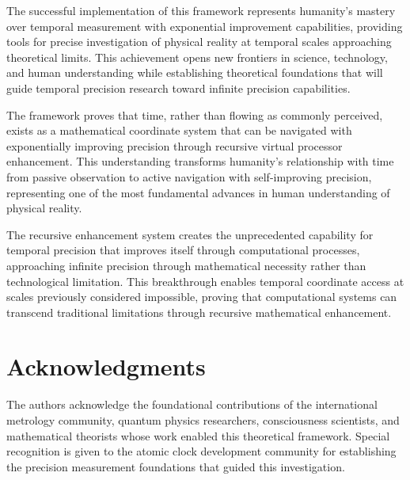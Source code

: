 \documentclass[11pt]{article}
\theoremstyle{remark}
\begin{document}
The successful implementation of this framework represents humanity's mastery over temporal measurement with exponential improvement capabilities, providing tools for precise investigation of physical reality at temporal scales approaching theoretical limits. This achievement opens new frontiers in science, technology, and human understanding while establishing theoretical foundations that will guide temporal precision research toward infinite precision capabilities.

The framework proves that time, rather than flowing as commonly perceived, exists as a mathematical coordinate system that can be navigated with exponentially improving precision through recursive virtual processor enhancement. This understanding transforms humanity's relationship with time from passive observation to active navigation with self-improving precision, representing one of the most fundamental advances in human understanding of physical reality.

The recursive enhancement system creates the unprecedented capability for temporal precision that improves itself through computational processes, approaching infinite precision through mathematical necessity rather than technological limitation. This breakthrough enables temporal coordinate access at scales previously considered impossible, proving that computational systems can transcend traditional limitations through recursive mathematical enhancement.

\section*{Acknowledgments}

The authors acknowledge the foundational contributions of the international metrology community, quantum physics researchers, consciousness scientists, and mathematical theorists whose work enabled this theoretical framework. Special recognition is given to the atomic clock development community for establishing the precision measurement foundations that guided this investigation.
\end{document}
